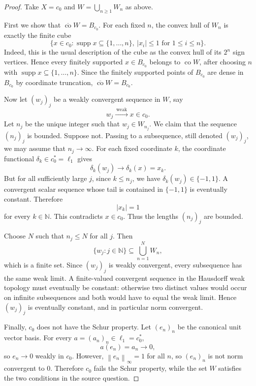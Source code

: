 \documentclass[11pt]{article}
\newcommand{\N}{\mathbb{N}}
\newcommand{\co}{\operatorname{co}}
\newcommand{\supp}{\operatorname{supp}}
\newcommand{\norm}[1]{\left\lVert #1 \right\rVert}
\begin{document}
\begin{proof}
Take \(X=c_0\) and \(W=\bigcup_{n\geq 1} W_n\) as above.

First we show that \(\overline{\co} W=B_{c_0}\).  For each fixed \(n\),
the convex hull of \(W_n\) is exactly the finite cube
\[
  \{x\in c_0:\supp x\subseteq\{1,\ldots,n\},\ |x_i|\leq 1
  \text{ for }1\leq i\leq n\}.
\]
Indeed, this is the usual description of the cube as the convex hull of
its \(2^n\) sign vertices.  Hence every finitely supported \(x\in B_{c_0}\)
belongs to \(\co W\), after choosing \(n\) with \(\supp x\subseteq
\{1,\ldots,n\}\).  Since the finitely supported points of \(B_{c_0}\) are
dense in \(B_{c_0}\) by coordinate truncation, \(\overline{\co} W=B_{c_0}\).

Now let \((w_j)_j\) be a weakly convergent sequence in \(W\), say
\[
  w_j \xrightarrow{\ \mathrm{weak}\ } x\in c_0.
\]
Let \(n_j\) be the unique integer such that \(w_j\in W_{n_j}\).  We claim
that the sequence \((n_j)_j\) is bounded.  Suppose not.  Passing to a
subsequence, still denoted \((w_j)_j\), we may assume that \(n_j\to\infty\).
For each fixed coordinate \(k\), the coordinate functional
\(\delta_k\in c_0^*=\ell_1\) gives
\[
  \delta_k(w_j)\longrightarrow \delta_k(x)=x_k.
\]
But for all sufficiently large \(j\), since \(k\leq n_j\), we have
\(\delta_k(w_j)\in\{-1,1\}\).  A convergent scalar sequence whose tail is
contained in \(\{-1,1\}\) is eventually constant.  Therefore
\[
  |x_k|=1
\]
for every \(k\in\N\).  This contradicts \(x\in c_0\).  Thus the lengths
\((n_j)_j\) are bounded.

Choose \(N\) such that \(n_j\leq N\) for all \(j\).  Then
\[
  \{w_j:j\in\N\}\subseteq \bigcup_{n=1}^N W_n,
\]
which is a finite set.  Since \((w_j)_j\) is weakly convergent, every
subsequence has the same weak limit.  A finite-valued convergent sequence
in the Hausdorff weak topology must eventually be constant: otherwise two
distinct values would occur on infinite subsequences and both would have
to equal the weak limit.  Hence \((w_j)_j\) is eventually constant, and in
particular norm convergent.

Finally, \(c_0\) does not have the Schur property.  Let \((e_n)_n\) be the
canonical unit vector basis.  For every \(a=(a_n)_n\in\ell_1=c_0^*\),
\[
  a(e_n)=a_n\longrightarrow 0,
\]
so \(e_n\to 0\) weakly in \(c_0\).  However, \(\norm{e_n}_\infty=1\) for
all \(n\), so \((e_n)_n\) is not norm convergent to \(0\).  Therefore
\(c_0\) fails the Schur property, while the set \(W\) satisfies the two
conditions in the source question.
\end{proof}
\end{document}
